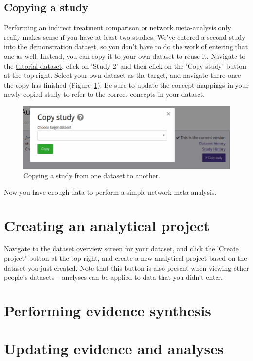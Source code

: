 \documentclass[12pt]{article}
\begin{document}
\subsection{Copying a study}

Performing an indirect treatment comparison or network meta-analysis only really makes sense if you have at least two studies. We've entered a second study into the demonstration dataset, so you don't have to do the work of entering that one as well. Instead, you can copy it to your own dataset to reuse it. Navigate to the \href{https://addis.drugis.org/#/users/12/datasets/c190e953-051c-4cf5-ac10-332984a14a43/versions/7e3468aa-dc7a-456b-ae08-18a1f1492c2e}{tutorial dataset}, click on 'Study 2' and then click on the 'Copy study' button at the top-right. Select your own dataset as the target, and navigate there once the copy has finished (Figure~\ref{fig:copyStudy}). Be sure to update the concept mappings in your newly-copied study to refer to the correct concepts in your dataset.

\begin{figure}[!htbp]
  \centering
  \includegraphics[width=\textwidth]{img/copyStudy.png}
  \caption{Copying a study from one dataset to another.}
\label{fig:copyStudy}
\end{figure}

Now you have enough data to perform a simple network meta-analysis.

\section{Creating an analytical project}

Navigate to the dataset overview screen for your dataset, and click the 'Create project' button at the top right, and create a new analytical project based on the dataset you just created. Note that this button is also present when viewing other people's datasets -- analyses can be applied to data that you didn't enter.

\section{Performing evidence synthesis}

\section{Updating evidence and analyses}
\end{document}
